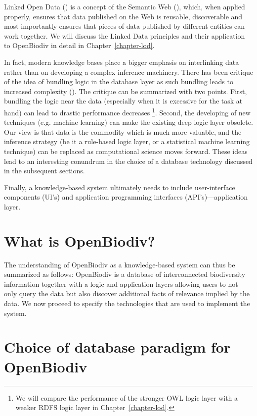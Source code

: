 Linked Open Data (\cite{heath_linked_2011}) is a concept of the Semantic Web (\cite{berners-lee_semantic_2001}), which, when applied properly, ensures that data published on the Web is reusable, discoverable and most importantly ensures that pieces of data published by different entities can work together.  We will discuss the Linked Data principles and their application to OpenBiodiv in detail in Chapter~\ref{chapter-lod}.

In fact, modern knowledge bases place a bigger emphasis on interlinking data rather than on developing a complex inference machinery. There has been critique of the idea of bundling logic in the database layer as such bundling leads to increased complexity (\cite{barrasa_rdf_2017}). The critique can be summarized with two points. First, bundling the logic near the data (especially when it is excessive for the task at hand) can lead to drastic performance decreases \footnote{We will compare the performance of the stronger OWL logic layer with a weaker RDFS logic layer in Chapter~\ref{chapter-lod}.}. Second, the developing of new techniques (e.g. machine learning) can make the existing deep logic layer obsolete. Our view is that data is the commodity which is much more valuable, and the inference strategy (be it a rule-based logic layer, or a statistical machine learning technique) can be replaced as computational science moves forward. These ideas lead to an interesting conundrum in the choice of a database technology discussed in the subsequent sections.

Finally, a knowledge-based system ultimately needs to include user-interface components (UI's) and application programming interfaces (API's)---application layer.

\section{What is OpenBiodiv?}

The understanding of OpenBiodiv as a knowledge-based system can thus be summarized as follows: OpenBiodiv is a  database of interconnected biodiversity information together with a logic and application layers allowing users to not only query the data but also discover additional facts of relevance implied by the data. We now proceed to specify the technologies that are used to implement the system.

\section{Choice of database paradigm for OpenBiodiv}

